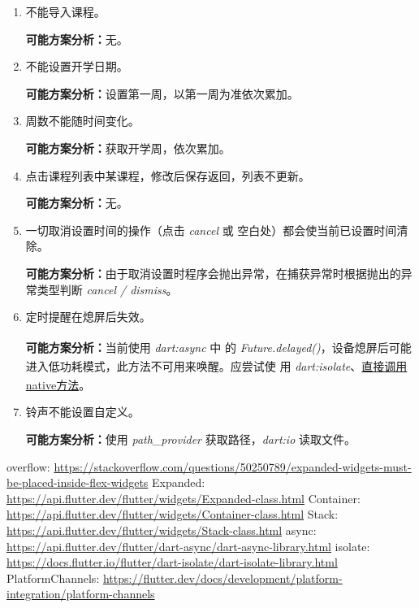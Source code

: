 \documentclass{article}
\begin{document}
    \begin{enumerate}
      \item 不能导入课程。

        \textbf{可能方案分析：}无。

      \item 不能设置开学日期。

        \textbf{可能方案分析：}设置第一周，以第一周为准依次累加。

      \item 周数不能随时间变化。

        \textbf{可能方案分析：}获取开学周，依次累加。

      \item 点击课程列表中某课程，修改后保存返回，列表不更新。

        \textbf{可能方案分析：}无。

      \item 一切取消设置时间的操作（点击 \textit{cancel} 或 空白处）都会使当前已设置时间清除。

        \textbf{可能方案分析：}由于取消设置时程序会抛出异常，在捕获异常时根据抛出的异常类型判断
        \textit{cancel / dismiss}。

      \item 定时提醒在熄屏后失效。

        \textbf{可能方案分析：}当前使用 \textit{dart:async}\textsuperscript{\cite{ref:async}} 中
        的 \textit{Future.delayed()}，设备熄屏后可能进入低功耗模式，此方法不可用来唤醒。应尝试使
        用 \textit{dart:isolate}\textsuperscript{\cite{ref:isolate}}、\uline{直接调用native方法}\textsuperscript{\cite{ref:PlatformChannels}}。

      \item 铃声不能设置自定义。

        \textbf{可能方案分析：}使用 \textit{path\_provider} 获取路径，\textit{dart:io} 读取文件。
    \end{enumerate}

\begin{thebibliography}{99}
   overflow: \url{https://stackoverflow.com/questions/50250789/expanded-widgets-must-be-placed-inside-flex-widgets}
   Expanded: \url{https://api.flutter.dev/flutter/widgets/Expanded-class.html}
   Container: \url{https://api.flutter.dev/flutter/widgets/Container-class.html}
   Stack: \url{https://api.flutter.dev/flutter/widgets/Stack-class.html}
   async: \url{https://api.flutter.dev/flutter/dart-async/dart-async-library.html}
   isolate: \url{https://docs.flutter.io/flutter/dart-isolate/dart-isolate-library.html}
   PlatformChannels: \url{https://flutter.dev/docs/development/platform-integration/platform-channels}
\end{thebibliography}
\end{document}
